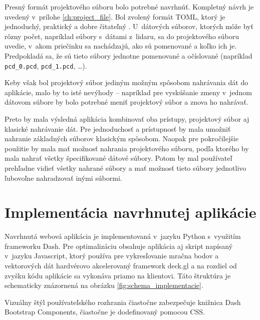 Presný formát projektového súboru bolo potrebné navrhnúť. Kompletný návrh je uvedený v~prílohe \ref{ch:project_file}. Bol zvolený formát TOML, ktorý je jednoduchý, praktický a dobre čitateľný \cite{toml}. U~dátových súborov, ktorých môže byť rôzny počet, napríklad súbory s~dátami z~lidaru, sa do projektového súboru uvedie, v~akom priečinku sa nachádzajú, ako sú pomenované a koľko ich je. Predpokladá sa, že sú tieto súbory jednotne pomenované a očíslované (napríklad \texttt{pcd\_0.pcd}, \texttt{pcd\_1.pcd}, \dots).

Keby však bol projektový súbor jediným možným spôsobom nahrávania dát do aplikácie, malo by to isté nevýhody -- napríklad pre vyskúšanie zmeny v~jednom dátovom súbore by bolo potrebné meniť projektový súbor a znova ho nahrávať.

Preto by mala výsledná aplikácia kombinovať oba prístupy, projektový súbor aj klasické nahrávanie dát. Pre jednoduchosť a prístupnosť by mala umožniť nahranie základných súborov klasickým spôsobom. Naopak pre pokročilejšie použitie by mala mať možnosť nahrania projektového súboru, podľa ktorého by mala nahrať všetky špecifikované dátové súbory. Potom by mal používateľ prehľadne vidieť všetky nahrané súbory a mať možnosť tieto súbory jednotlivo ľubovoľne nahradzovať inými súbormi.

\chapter{Implementácia navrhnutej aplikácie}
\label{ch:implementacia}

Navrhnutá webová aplikácia je implementovaná v~jazyku Python s~využitím frameworku Dash. Pre optimalizáciu obsahuje aplikácia aj skript napísaný v~jazyku Javascript, ktorý používa pre vykresľovanie mračna bodov a vektorových dát hardvérovo akcelerovaný framework deck.gl a na rozdiel od zvyšku kódu aplikácie sa vykonáva priamo na klientovi. Táto štruktúra je schematicky znázornená na obrázku \ref{fig:schema_implementacie}.

Vizuálny štýl používateľského rozhrania čiastočne zabezpečuje knižnica Dash Bootstrap Components, čiastočne je dodefinovaný pomocou CSS.

